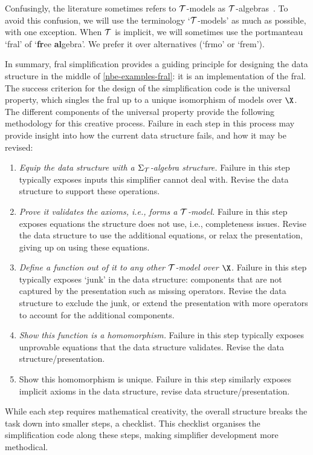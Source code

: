 Confusingly, the literature sometimes refers to $\mathcal{T}$-models as
$\mathcal{T}$-algebras~\cite[\S{}V.6]{mac-lane:categories-2nd-ed}. To avoid
this confusion, we will use the terminology `$\mathcal{T}$-models' as much as
possible, with one exception. When $\mathcal{T}$ is implicit, we will
sometimes use the portmanteau `fral' of `\textbf{fr}ee
\textbf{al}gebra'. We prefer it over alternatives (`frmo' or `frem').

In summary, fral simplification provides a guiding principle
for designing the data structure in the middle of
\eqref{nbe-examples-fral}: it is an implementation of the fral.
%
\label{methodology-anchor}%
The success criterion for the design of the simplification code is the
universal property, which singles the fral up to a unique isomorphism
of models over $\X$. The different components of the universal
property provide the following methodology for this creative process.  Failure in
each step in this process may provide insight into how the current
data structure fails, and how it may be revised:
\begin{enumerate}
\item\label{methodology-step-structure} \textit{Equip the data structure with
  a $\Sigma_{\mathcal{T}}$-algebra structure.} Failure in this step typically exposes
  inputs this simplifier cannot deal with. Revise the data structure to
  support these operations.
\item\label{methodology-step-validation} \textit{Prove it validates the
  axioms, i.e., forms a $\mathcal{T}$-model.}  Failure in this step
  exposes equations the structure does not use, i.e., completeness
  issues. Revise the data structure to use the additional equations, or
  relax the presentation, giving up on using these equations.
\item\label{methodology-step-existence} \textit{Define a function out of
  it to any other $\mathcal{T}$-model over $\X$.} Failure in this step
  typically exposes `junk' in the data structure: components that are
  not captured by the presentation such as missing operators.
  Revise the data structure to exclude the junk, or extend the presentation
  with more operators to account for the additional components.
\item\label{methodology-step-homomorphic}
  \textit{Show this function is a homomorphism.}
  Failure in this step typically exposes unprovable
  equations that the data structure validates.
  Revise the data structure/presentation.
\item\label{methodology-step-4-uniqueness} Show this homomorphism is
  unique.  Failure in this step similarly exposes implicit axioms in
  the data structure, revise data structure/presentation.
\end{enumerate}
While each step requires mathematical creativity, the overall structure
breaks the task down into smaller steps, a checklist. This checklist
organises the simplification code along these steps, making simplifier
development more methodical.

